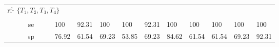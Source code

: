 \begin{table}
{\begin{tabularx}{1.01\textwidth}{@{}l	lllr	 ll	lllr	 ll	lllr@{}}
	
  \end{tabularx}  
  \bigskip
  \begin{tabularx}{1.01\linewidth}{@{}lllllll	llllllllll@{}}	
  \multicolumn{16}{l}{\ac{rf}- $\{T_{1},T_{2},T_{3},T_{4}\}$}\\
  \multicolumn{16}{l}{}\\[-1ex]
  \midrule
	&  &  & \multicolumn{2}{c}{\ac{se}}        &  &  & 100 & 92.31 & 100 & 100 & 92.31 & \cellcolor[gray]{0.8}100 & 100 & 100 & 100 & \cellcolor[gray]{0.8}100 \\
	&  &  & \multicolumn{2}{c}{\ac{sp}}  	  &  &  & 76.92 & 61.54 & 69.23 & 53.85 & 69.23 & \cellcolor[gray]{0.8}84.62 & 61.54 &61.54 & 69.23 & \cellcolor[gray]{0.8}92.31\\
  \bottomrule
  \end{tabularx}
}
\end{table}
